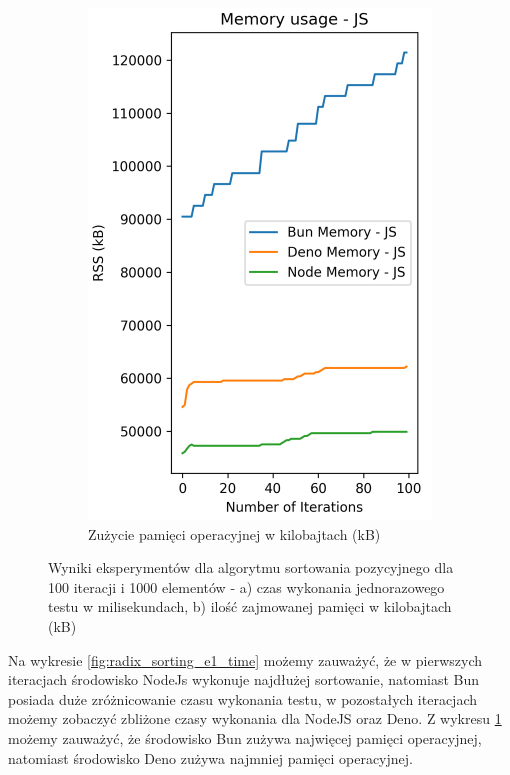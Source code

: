 \begin{figure}[H]
\begin{subfigure}[b]{0.42\textwidth}
    \includegraphics[width=\textwidth]{Figures/sorting/sorting_radix_100_1000_js_memory.png}
    \caption{Zużycie pamięci operacyjnej w kilobajtach (kB)}
    \label{fig:radix_sorting_e1_memory}
  \end{subfigure}
  \caption{Wyniki eksperymentów dla algorytmu sortowania pozycyjnego dla 100 iteracji i 1000 elementów - a) czas wykonania jednorazowego testu w milisekundach, b) ilość zajmowanej pamięci w kilobajtach (kB)}
  \label{fig:radix_sorting_e1}
\end{figure}

Na wykresie \ref{fig:radix_sorting_e1_time} możemy zauważyć, że w pierwszych iteracjach środowisko NodeJs wykonuje najdłużej sortowanie, natomiast Bun posiada duże zróżnicowanie czasu wykonania testu, w pozostałych iteracjach możemy zobaczyć zbliżone czasy wykonania dla NodeJS oraz Deno. Z wykresu \ref{fig:radix_sorting_e1_memory} możemy zauważyć, że środowisko Bun zużywa najwięcej pamięci operacyjnej, natomiast środowisko Deno zużywa najmniej pamięci operacyjnej.

